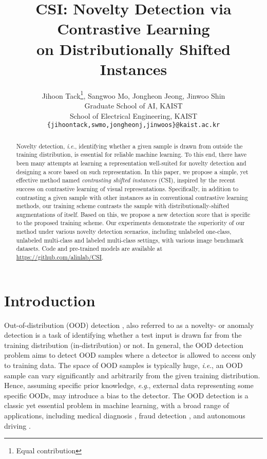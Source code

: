 \documentclass{article}
\title{CSI: Novelty Detection via Contrastive Learning\\on Distributionally Shifted Instances}
\author{Jihoon Tack\thanks{Equal contribution}, Sangwoo Mo, Jongheon Jeong, Jinwoo Shin \\
  Graduate School of AI, KAIST\\
  School of Electrical Engineering, KAIST\\
  \texttt{\{jihoontack,swmo,jongheonj,jinwoos\}@kaist.ac.kr} \\
}
\newcommand{\ie}{\textit{i}.\textit{e}.}
\newcommand{\eg}{\textit{e}.\textit{g}.}
\begin{document}
\maketitle

\begin{abstract}
Novelty detection, \ie, identifying whether a given sample is drawn from outside the training distribution, is essential for reliable machine learning. To this end, there have been many attempts at learning a representation well-suited for novelty detection and designing a score based on such representation. In this paper, we propose a simple, yet effective method named \emph{contrasting shifted instances} (CSI), inspired by the recent success on contrastive learning of visual representations. Specifically, in addition to contrasting a given sample with other instances as in conventional contrastive learning methods, our training scheme contrasts the sample with distributionally-shifted augmentations of itself. Based on this, we propose a new detection score that is specific to the proposed training scheme. Our experiments demonstrate the superiority of our method under various novelty detection scenarios, including unlabeled one-class, unlabeled multi-class and labeled multi-class settings, with various image benchmark datasets. Code and pre-trained models are available at \url{https://github.com/alinlab/CSI}.
\end{abstract}
 \section{Introduction}
\label{sec:intro}

Out-of-distribution (OOD) detection \citep{hodge2004survey}, also referred to as a novelty- or anomaly detection is a task of identifying whether a test input is drawn far from the training distribution (in-distribution) or not. In general, the OOD detection problem aims to detect OOD samples where a detector is allowed to access only to training data. The space of OOD samples is typically huge, \ie, an OOD sample can vary significantly and arbitrarily from the given training distribution. Hence, assuming specific prior knowledge, \eg, external data representing some specific OODs, may introduce a bias to the detector. The OOD detection is a classic yet essential problem in machine learning, with a broad range of applications, including medical diagnosis \citep{caruana2015intelligible}, fraud detection \citep{phua2010comprehensive}, and autonomous driving \citep{eykholt2018robust}.
\end{document}
